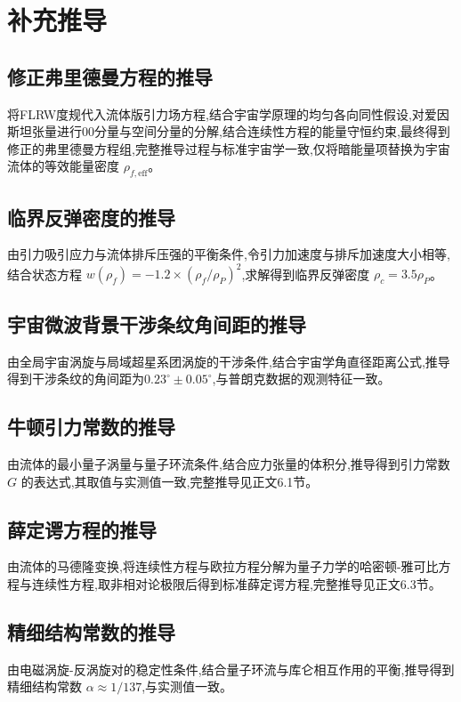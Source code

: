 \documentclass[11pt,a4paper]{article}
\begin{document}
\section{补充推导}
\subsection{修正弗里德曼方程的推导}
\label{app:friedman}
将FLRW度规代入流体版引力场方程,结合宇宙学原理的均匀各向同性假设,对爱因斯坦张量进行00分量与空间分量的分解,结合连续性方程的能量守恒约束,最终得到修正的弗里德曼方程组,完整推导过程与标准宇宙学一致,仅将暗能量项替换为宇宙流体的等效能量密度 $\rho_{f,\text{eff}}$。

\subsection{临界反弹密度的推导}
\label{app:bounce}
由引力吸引应力与流体排斥压强的平衡条件,令引力加速度与排斥加速度大小相等,结合状态方程 $w(\rho_f) = -1.2\times(\rho_f/\rho_P)^2$,求解得到临界反弹密度 $\rho_c=3.5\rho_P$。

\subsection{宇宙微波背景干涉条纹角间距的推导}
\label{app:cmb_stripe}
由全局宇宙涡旋与局域超星系团涡旋的干涉条件,结合宇宙学角直径距离公式,推导得到干涉条纹的角间距为$0.23^\circ\pm0.05^\circ$,与普朗克数据的观测特征一致。

\subsection{牛顿引力常数的推导}
\label{app:G_derivation}
由流体的最小量子涡量与量子环流条件,结合应力张量的体积分,推导得到引力常数 $G$ 的表达式,其取值与实测值一致,完整推导见正文6.1节。

\subsection{薛定谔方程的推导}
\label{app:schrodinger}
由流体的马德隆变换,将连续性方程与欧拉方程分解为量子力学的哈密顿-雅可比方程与连续性方程,取非相对论极限后得到标准薛定谔方程,完整推导见正文6.3节。

\subsection{精细结构常数的推导}
\label{app:alpha}
由电磁涡旋-反涡旋对的稳定性条件,结合量子环流与库仑相互作用的平衡,推导得到精细结构常数 $\alpha\approx1/137$,与实测值一致。
\end{document}
